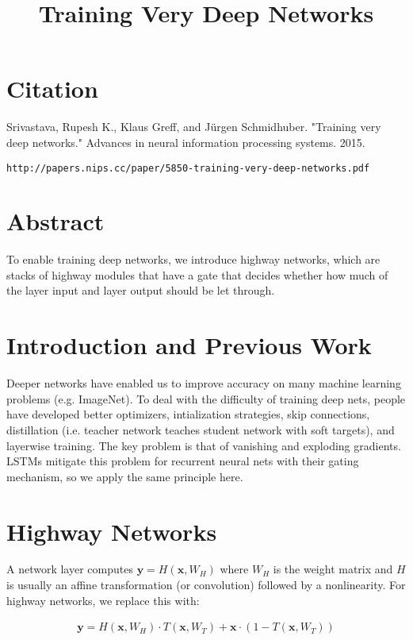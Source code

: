 \documentclass[a4paper]{article}
\title{Training Very Deep Networks}
\date{}
\begin{document}
\maketitle

\section{Citation}
Srivastava, Rupesh K., Klaus Greff, and Jürgen Schmidhuber. "Training very deep networks." Advances in neural information processing systems. 2015.

\begin{verbatim}
http://papers.nips.cc/paper/5850-training-very-deep-networks.pdf
\end{verbatim}

\section{Abstract}
To enable training deep networks, we introduce highway networks, which are
stacks of highway modules that have a gate that decides whether how much
of the layer input and layer output should be let through.

\section{Introduction and Previous Work}
Deeper networks have enabled us to improve accuracy on many machine learning
problems (e.g. ImageNet). To deal with the difficulty of training deep nets,
people have developed better optimizers, intialization strategies, skip
connections, distillation (i.e. teacher network teaches student network
with soft targets), and layerwise training. The key problem is that of vanishing
and exploding gradients. LSTMs mitigate this problem for recurrent neural nets
with their gating mechanism, so we apply the same principle here.

\section{Highway Networks}
A network layer computes $\bm{y} = H(\bm{x}, W_H)$ where $W_H$ is the weight
matrix and $H$ is usually an affine transformation (or convolution) followed
by a nonlinearity. For highway networks, we replace this with:

\begin{align}
  \bm{y} = H(\bm{x}, W_H) \cdot T(\bm{x}, W_T) + \bm{x} \cdot
  (1 - T(\bm{x}, W_T))
\end{align}
\end{document}
